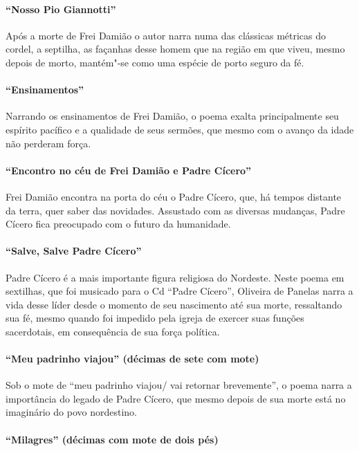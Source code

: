 \paragraph{``Nosso Pio Giannotti''}

Após a morte de Frei Damião o autor narra numa das clássicas métricas do
cordel, a septilha, as façanhas desse homem que na região em que viveu,
mesmo depois de morto, mantém"-se como uma espécie de porto seguro da fé.

\paragraph{``Ensinamentos''}

Narrando os ensinamentos de Frei Damião, o poema exalta principalmente
seu espírito pacífico e a qualidade de seus sermões, que mesmo com o
avanço da idade não perderam força.

\paragraph{``Encontro no céu de Frei Damião e Padre Cícero''}

Frei Damião encontra na porta do céu o Padre Cícero,
que, há tempos distante da terra, quer saber das novidades. 
Assustado com as diversas mudanças, Padre Cícero fica preocupado com o futuro da
humanidade.

\paragraph{``Salve, Salve Padre Cícero''}

Padre Cícero é a mais importante figura religiosa do Nordeste. Neste
poema em sextilhas, que foi musicado para o Cd ``Padre
Cícero'', Oliveira de Panelas narra a vida desse líder desde o momento
de seu nascimento até sua morte, ressaltando sua fé, mesmo quando 
foi impedido pela igreja de exercer suas funções sacerdotais, em consequência
de sua força política.

\paragraph{``Meu padrinho viajou'' (décimas de sete com mote)}

Sob o mote de ``meu padrinho viajou/ vai retornar
brevemente'', o poema narra a importância do legado de Padre
Cícero, que mesmo depois de sua morte está no imaginário do povo nordestino.

\paragraph{``Milagres'' (décimas com mote de dois pés)}

